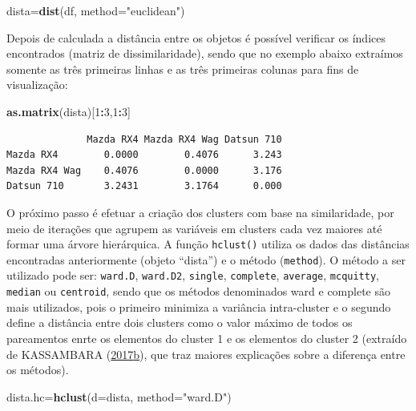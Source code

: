 \documentclass[12pt,brazil,oneside]{book}
\newenvironment{Shaded}{\begin{snugshade}}{\end{snugshade}}
\newcommand{\DataTypeTok}[1]{\textcolor[rgb]{0.13,0.29,0.53}{#1}}
\newcommand{\DecValTok}[1]{\textcolor[rgb]{0.00,0.00,0.81}{#1}}
\newcommand{\KeywordTok}[1]{\textcolor[rgb]{0.13,0.29,0.53}{\textbf{#1}}}
\newcommand{\NormalTok}[1]{#1}
\newcommand{\OperatorTok}[1]{\textcolor[rgb]{0.81,0.36,0.00}{\textbf{#1}}}
\newcommand{\StringTok}[1]{\textcolor[rgb]{0.31,0.60,0.02}{#1}}
\begin{document}
\begin{Shaded}
\begin{Highlighting}[]
\NormalTok{dista=}\KeywordTok{dist}\NormalTok{(df, }\DataTypeTok{method=}\StringTok{"euclidean"}\NormalTok{)}
\end{Highlighting}
\end{Shaded}

Depois de calculada a distância entre os objetos é possível verificar os índices encontrados (matriz de dissimilaridade), sendo que no exemplo abaixo extraímos somente as três primeiras linhas e as três primeiras colunas para fins de visualização:

\begin{Shaded}
\begin{Highlighting}[]
\KeywordTok{as.matrix}\NormalTok{(dista)[}\DecValTok{1}\OperatorTok{:}\DecValTok{3}\NormalTok{,}\DecValTok{1}\OperatorTok{:}\DecValTok{3}\NormalTok{]}
\end{Highlighting}
\end{Shaded}

\begin{verbatim}
              Mazda RX4 Mazda RX4 Wag Datsun 710
Mazda RX4        0.0000        0.4076      3.243
Mazda RX4 Wag    0.4076        0.0000      3.176
Datsun 710       3.2431        3.1764      0.000
\end{verbatim}

O próximo passo é efetuar a criação dos clusters com base na similaridade, por meio de iterações que agrupem as variáveis em clusters cada vez maiores até formar uma árvore hierárquica. A função \texttt{hclust()} utiliza os dados das distâncias encontradas anteriormente (objeto ``dista'') e o método (\texttt{method}). O método a ser utilizado pode ser: \texttt{ward.D}, \texttt{ward.D2}, \texttt{single}, \texttt{complete}, \texttt{average}, \texttt{mcquitty}, \texttt{median} ou \texttt{centroid}, sendo que os métodos denominados ward e complete são mais utilizados, pois o primeiro minimiza a variância intra-cluster e o segundo define a distância entre dois clusters como o valor máximo de todos os pareamentos enrte os elementos do cluster 1 e os elementos do cluster 2 (extraído de KASSAMBARA (\protect\hyperlink{ref-Kassambara2017}{2017}\protect\hyperlink{ref-Kassambara2017}{b}), que traz maiores explicações sobre a diferença entre os métodos).

\begin{Shaded}
\begin{Highlighting}[]
\NormalTok{dista.hc=}\KeywordTok{hclust}\NormalTok{(}\DataTypeTok{d=}\NormalTok{dista, }\DataTypeTok{method=}\StringTok{"ward.D"}\NormalTok{)}
\end{Highlighting}
\end{Shaded}
\end{document}
